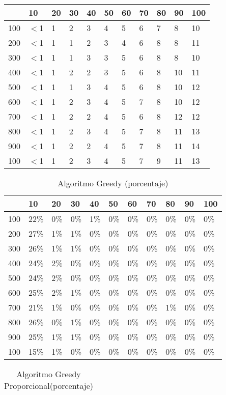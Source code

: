 \documentclass{article}
\begin{document}
\begin{center}
\begin{table}
\begin{tabularx}{0.8\textwidth}{|X|X|X|X|X|X|X|X|X|X|X|}
\hline &10&20&30&40&50&60&70&80&90&100\\
\hline 100&$<$1&1&2&3&4&5&6&7&8&10\\
\hline 200&$<$1&1&1&2&3&4&6&8&8&11\\
\hline 300&$<$1&1&1&3&3&5&6&8&8&10\\
\hline 400&$<$1&1&2&2&3&5&6&8&10&11\\
\hline 500&$<$1&1&1&3&4&5&6&8&10&12\\
\hline 600&$<$1&1&2&3&4&5&7&8&10&12\\
\hline 700&$<$1&1&2&2&4&5&6&8&12&12\\
\hline 800&$<$1&1&2&3&4&5&7&8&11&13\\
\hline 900&$<$1&1&2&2&4&5&7&8&11&14\\
\hline 100&$<$1&1&2&3&4&5&7&9&11&13\\
\hline
\end{tabularx}
\end{table}
\begin{table}
\centering
\caption{Algoritmo Greedy (porcentaje)}
\begin{tabularx}{0.8\textwidth}{|X|X|X|X|X|X|X|X|X|X|X|}
\hline &10&20&30&40&50&60&70&80&90&100\\
\hline 100&22\%&0\%&0\%&1\%&0\%&0\%&0\%&0\%&0\%&0\%\\
\hline 200&27\%&1\%&1\%&0\%&0\%&0\%&0\%&0\%&0\%&0\%\\
\hline 300&26\%&1\%&1\%&0\%&0\%&0\%&0\%&0\%&0\%&0\%\\
\hline 400&24\%&2\%&0\%&0\%&0\%&0\%&0\%&0\%&0\%&0\%\\
\hline 500&24\%&2\%&0\%&0\%&0\%&0\%&0\%&0\%&0\%&0\%\\
\hline 600&25\%&2\%&1\%&0\%&0\%&0\%&0\%&0\%&0\%&0\%\\
\hline 700&21\%&1\%&0\%&0\%&0\%&0\%&0\%&1\%&0\%&0\%\\
\hline 800&26\%&0\%&1\%&0\%&0\%&0\%&0\%&0\%&0\%&0\%\\
\hline 900&25\%&1\%&1\%&0\%&0\%&0\%&0\%&0\%&0\%&0\%\\
\hline 100&15\%&1\%&0\%&0\%&0\%&0\%&0\%&0\%&0\%&0\%\\
\hline
\end{tabularx}
\end{table}
\begin{table}
\centering
\caption{Algoritmo Greedy Proporcional(porcentaje)}
\begin{tabularx}{0.8\textwidth}{|X|X|X|X|X|X|X|X|X|X|X|}

\end{tabularx}
\end{table}
\end{center}
\end{document}
